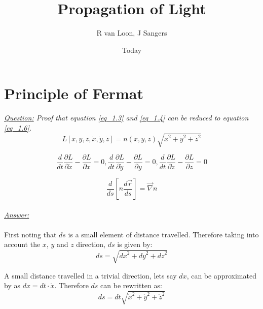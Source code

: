 \documentclass{article}
\begin{document}
\title{Propagation of Light}
\author{R van Loon, J Sangers}
\date{Today}
\maketitle

\section{Principle of Fermat}

\textit{\underline{Question:} Proof that equation \ref{eq_1.3} and \ref{eq_1.4} can be reduced to equation \ref{eq_1.6}.} \\

\begin{equation}
	\label{eq_1.3}
	L[x,y,z,\dot{x},\dot{y},\dot{z}] = n(x,y,z)\sqrt{\dot{x}^2+\dot{y}^2+\dot{z}^2}
\end{equation}

\begin{equation}
	\label{eq_1.4}
	\frac{d}{dt} \frac{\partial L}{\partial \dot{x}} - \frac{\partial L}{\partial x} = 0, \frac{d}{dt} \frac{\partial L}{\partial \dot{y}} - \frac{\partial L}{\partial y} = 0, \frac{d}{dt} \frac{\partial L}{\partial \dot{z}} - \frac{\partial L}{\partial z} = 0
\end{equation}

\begin{equation}
	\label{eq_1.6}
	\frac{d}{ds} \left[ n \frac{d \vec{r}}{ds} \right] = \vec{\nabla} n
\end{equation} \\
\textit{\underline{Answer:}}\\
\\
First noting that $ds$ is a small element of distance travelled. Therefore taking into account the $x$, $y$ and $z$ direction, $ds$ is given by: \\

\begin{equation*}
	ds = \sqrt{{dx}^2+{dy}^2+{dz}^2}
\end{equation*}

A small distance travelled in a trivial direction, lets say $dx$, can be approximated by as $dx = dt \cdot \dot{x}$. Therefore $ds$ can be rewritten as: \\

\begin{equation*}
	ds = dt \sqrt{\dot{x}^2+\dot{y}^2+\dot{z}^2}
\end{equation*}
\end{document}
